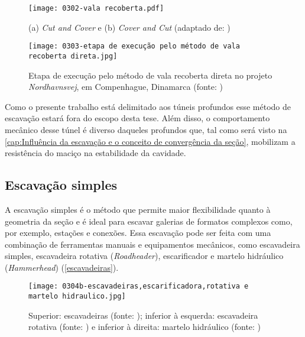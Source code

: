 \begin{figure}[H]
	\begin{center}
		\texttt{[image: 0302-vala recoberta.pdf]}
	\end{center}
	\caption{\label{vala_recoberta}(a) \textit{Cut and Cover} e (b) \textit{Cover and Cut} (adaptado de: )}
\end{figure}

\begin{figure}[H]
	\begin{center}
		\texttt{[image: 0303-etapa de execução pelo método de vala recoberta direta.jpg]}
	\end{center}
	\caption{\label{etapa_execucao_vala_recoberta}Etapa de execução pelo método de vala recoberta direta no projeto \textit{Nordhavnsvej}, em Compenhague, Dinamarca (fonte: )}
\end{figure}

Como o presente trabalho está delimitado aos túneis profundos esse método de escavação estará fora do escopo desta tese. Além disso, o comportamento mecânico desse túnel é diverso daqueles profundos que, tal como será visto na \autoref{cap:Influência da escavação e o conceito de convergência da seção}, mobilizam a resistência do maciço na estabilidade da cavidade.


\subsection{Escavação simples}

A escavação simples é o método que permite maior flexibilidade quanto à geometria da seção e é ideal para escavar galerias de formatos complexos como, por exemplo, estações e conexões. Essa escavação pode ser feita com uma combinação de ferramentas manuais e equipamentos mecânicos, como escavadeira simples, escavadeira rotativa (\textit{Roadheader}), escarificador e martelo hidráulico (\textit{Hammerhead}) (\autoref{escavadeiras}).

\begin{figure}[H]
	\begin{center}
		\texttt{[image: 0304b-escavadeiras,escarificadora,rotativa e martelo hidraulico.jpg]}
	\end{center}
	\caption{\label{escavadeiras}Superior: escavadeiras (fonte: ); inferior à esquerda: escavadeira rotativa (fonte: ) e inferior à direita: martelo hidráulico  (fonte: )}
\end{figure}


